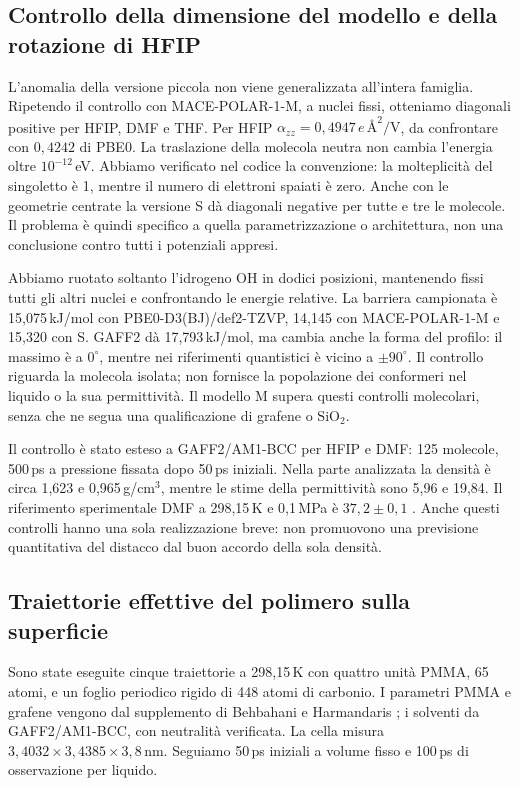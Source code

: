 \documentclass[11pt,reqno]{amsart}
\numberwithin{equation}{section}
\newcommand{\SiO}{\ensuremath{\mathrm{SiO}_2}}
\begin{document}
\subsection{Controllo della dimensione del modello e della rotazione di HFIP}

L'anomalia della versione piccola non viene generalizzata all'intera
famiglia. Ripetendo il controllo con MACE-POLAR-1-M, a nuclei fissi,
otteniamo diagonali positive per HFIP, DMF e THF. Per HFIP
$\alpha_{zz}=0{,}4947\,e\,\text{\AA}^2/\mathrm V$, da confrontare
con $0{,}4242$ di PBE0. La traslazione della molecola neutra non cambia
l'energia oltre $10^{-12}$\,eV. Abbiamo verificato nel codice la
convenzione: la molteplicit\`a del singoletto \`e 1, mentre il numero
di elettroni spaiati \`e zero. Anche con le geometrie centrate la
versione S d\`a diagonali negative per tutte e tre le molecole.
Il problema \`e quindi specifico a quella parametrizzazione o architettura,
non una conclusione contro tutti i potenziali appresi.

Abbiamo ruotato soltanto l'idrogeno OH in dodici posizioni, mantenendo
fissi tutti gli altri nuclei e confrontando le energie relative.
La barriera campionata \`e 15,075\,kJ/mol con
PBE0-D3(BJ)/def2-TZVP, 14,145 con MACE-POLAR-1-M e 15,320 con S.
GAFF2 d\`a 17,793\,kJ/mol, ma cambia anche la forma del profilo:
il massimo \`e a $0^\circ$, mentre nei riferimenti quantistici
\`e vicino a $\pm90^\circ$. Il controllo riguarda la molecola isolata;
non fornisce la popolazione dei conformeri nel liquido o la sua
permittivit\`a. Il modello M supera questi controlli molecolari,
senza che ne segua una qualificazione di grafene o \SiO.

Il controllo \`e stato esteso a GAFF2/AM1-BCC per HFIP e DMF:
125 molecole, 500\,ps a pressione fissata dopo 50\,ps iniziali.
Nella parte analizzata la densit\`a \`e circa 1,623 e 0,965\,g/cm$^3$,
mentre le stime della permittivit\`a sono 5,96 e 19,84.
Il riferimento sperimentale DMF a 298,15\,K e 0,1\,MPa \`e
$37,2\pm0,1$ \cite{Hunger2010}. Anche questi controlli hanno
una sola realizzazione breve: non promuovono una previsione
quantitativa del distacco dal buon accordo della sola densit\`a.

\subsection{Traiettorie effettive del polimero sulla superficie}

Sono state eseguite cinque traiettorie a 298,15\,K con quattro unit\`a
PMMA, 65 atomi, e un foglio periodico rigido di 448 atomi di carbonio.
I parametri PMMA e grafene vengono dal supplemento di
Behbahani e Harmandaris \cite{Behbahani2021}; i solventi
da GAFF2/AM1-BCC, con neutralit\`a verificata. La cella misura
$3{,}4032\times3{,}4385\times3{,}8$\,nm. Seguiamo 50\,ps iniziali
a volume fisso e 100\,ps di osservazione per liquido.
\end{document}
